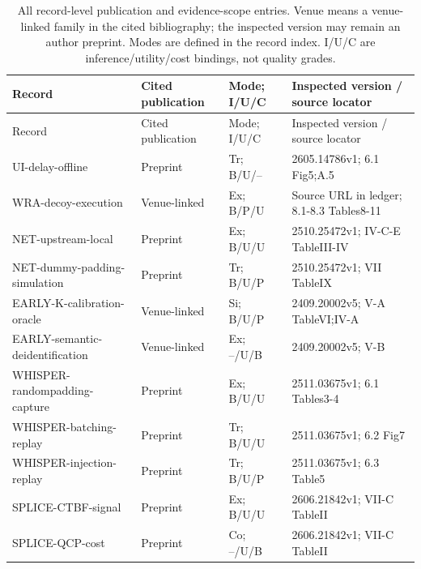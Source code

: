 \begin{longtable}{@{}p{}p{}p{}p{}@{}}
\caption{All record-level publication and evidence-scope entries. Venue means a venue-linked family in the cited bibliography; the inspected version may remain an author preprint. Modes are defined in the record index. I/U/C are inference/utility/cost bindings, not quality grades.}\label{tab:r33-source-status}\\
\toprule Record & Cited publication & Mode; I/U/C & Inspected version / source locator\\\midrule\endfirsthead
\toprule Record & Cited publication & Mode; I/U/C & Inspected version / source locator\\\midrule\endhead
\bottomrule\endfoot
UI-\allowbreak{}delay-\allowbreak{}offline~\cite{uitraces2026} & Preprint & Tr; B/U/-- & 2605.14786v1; 6.1 Fig5;A.5\\
WRA-\allowbreak{}decoy-\allowbreak{}execution~\cite{jeong2026wra} & Venue-linked & Ex; B/P/U & Source URL in ledger; 8.1-8.3 Tables8-11\\
NET-\allowbreak{}upstream-\allowbreak{}local~\cite{netecho2025} & Preprint & Ex; B/U/U & 2510.25472v1; IV-C-E TableIII-IV\\
NET-\allowbreak{}dummy-\allowbreak{}padding-\allowbreak{}simulation~\cite{netecho2025} & Preprint & Tr; B/U/P & 2510.25472v1; VII TableIX\\
EARLY-\allowbreak{}K-\allowbreak{}calibration-\allowbreak{}oracle~\cite{earlybird2025} & Venue-linked & Si; B/U/P & 2409.20002v5; V-A TableVI;IV-A\\
EARLY-\allowbreak{}semantic-\allowbreak{}deidentification~\cite{earlybird2025} & Venue-linked & Ex; --/U/B & 2409.20002v5; V-B\\
WHISPER-\allowbreak{}randompadding-\allowbreak{}capture~\cite{whisperleak2025} & Preprint & Ex; B/U/U & 2511.03675v1; 6.1 Tables3-4\\
WHISPER-\allowbreak{}batching-\allowbreak{}replay~\cite{whisperleak2025} & Preprint & Tr; B/U/U & 2511.03675v1; 6.2 Fig7\\
WHISPER-\allowbreak{}injection-\allowbreak{}replay~\cite{whisperleak2025} & Preprint & Tr; B/U/P & 2511.03675v1; 6.3 Table5\\
SPLICE-\allowbreak{}CTBF-\allowbreak{}signal~\cite{spliceleak2026} & Preprint & Ex; B/U/U & 2606.21842v1; VII-C TableII\\
SPLICE-\allowbreak{}QCP-\allowbreak{}cost~\cite{spliceleak2026} & Preprint & Co; --/U/B & 2606.21842v1; VII-C TableII\\

\end{longtable}
